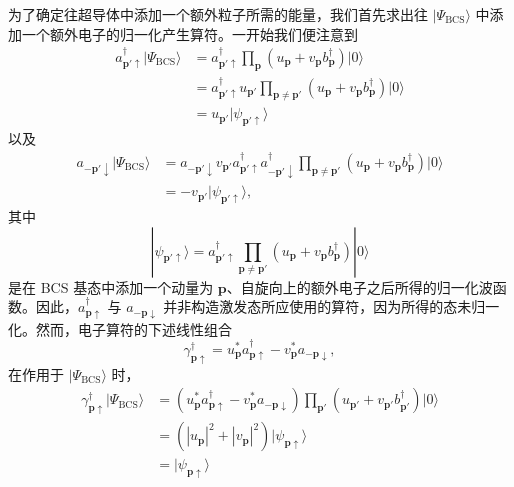 为了确定往超导体中添加一个额外粒子所需的能量，我们首先求出往 $|\Psi_{\mathrm{BCS}}\rangle$ 中添加一个额外电子的归一化产生算符。一开始我们便注意到
\begin{align*}
a_{\mathbf{p}'\uparrow}^{\dagger}|\Psi_{\mathrm{BCS}}\rangle&=a_{\mathbf{p}'\uparrow}^{\dagger}\prod_{\mathbf{p}}\left(u_{\mathbf{p}}+v_{\mathbf{p}}b_{\mathbf{p}}^{\dagger}\right)|0\rangle\\
&=a_{\mathbf{p}'\uparrow}^{\dagger}u_{\mathbf{p}'}\prod_{\mathbf{p}\neq\mathbf{p}'}\left(u_{\mathbf{p}}+v_{\mathbf{p}}b_{\mathbf{p}}^{\dagger}\right)|0\rangle\\
&=u_{\mathbf{p}'}|\psi_{\mathbf{p}'\uparrow}\rangle\tag{12.217}
\end{align*}
以及
\begin{align*}
a_{-\mathbf{p}'\downarrow}|\Psi_{\mathrm{BCS}}\rangle&=a_{-\mathbf{p}'\downarrow}v_{\mathbf{p}'}a_{\mathbf{p}'\uparrow}^{\dagger}a_{-\mathbf{p}'\downarrow}^{\dagger}\prod_{\mathbf{p}\neq\mathbf{p}'}\left(u_{\mathbf{p}}+v_{\mathbf{p}}b_{\mathbf{p}}^{\dagger}\right)|0\rangle\\
&=-v_{\mathbf{p}'}|\psi_{\mathbf{p}'\uparrow}\rangle,\tag{12.218}
\end{align*}
其中
\begin{equation*}
|\psi_{\mathbf{p}'\uparrow}\rangle=a_{\mathbf{p}'\uparrow}^{\dagger}\prod_{\mathbf{p}\neq\mathbf{p}'}\left(u_{\mathbf{p}}+v_{\mathbf{p}}b_{\mathbf{p}}^{\dagger}\right)|0\rangle\tag{12.219}
\end{equation*}
是在 BCS 基态中添加一个动量为 $\mathbf{p}$、自旋向上的额外电子之后所得的归一化波函数。因此，$a_{\mathbf{p}\uparrow}^{\dagger}$ 与 $a_{-\mathbf{p}\downarrow}$ 并非构造激发态所应使用的算符，因为所得的态未归一化。然而，电子算符的下述线性组合
\begin{equation*}
\gamma_{\mathbf{p}\uparrow}^{\dagger}=u_{\mathbf{p}}^{*}a_{\mathbf{p}\uparrow}^{\dagger}-v_{\mathbf{p}}^{*}a_{-\mathbf{p}\downarrow},\tag{12.220}
\end{equation*}
在作用于 $|\Psi_{\mathrm{BCS}}\rangle$ 时，
\begin{align*}
\gamma_{\mathbf{p}\uparrow}^{\dagger}|\Psi_{\mathrm{BCS}}\rangle&=\left(u_{\mathbf{p}}^{*}a_{\mathbf{p}\uparrow}^{\dagger}-v_{\mathbf{p}}^{*}a_{-\mathbf{p}\downarrow}\right)\prod_{\mathbf{p}'}\left(u_{\mathbf{p}'}+v_{\mathbf{p}'}b_{\mathbf{p}'}^{\dagger}\right)|0\rangle\\
&=\left(|u_{\mathbf{p}}|^{2}+|v_{\mathbf{p}}|^{2}\right)|\psi_{\mathbf{p}\uparrow}\rangle\\
&=|\psi_{\mathbf{p}\uparrow}\rangle\tag{12.221}
\end{align*}
